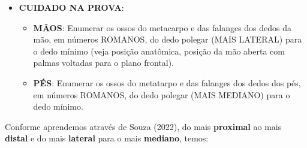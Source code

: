 \documentclass[
]{book}
\providecommand{\tightlist}{%
  \setlength{\itemsep}{0pt}\setlength{\parskip}{0pt}}
\begin{document}
\begin{itemize}
\tightlist
\item
  \textbf{CUIDADO NA PROVA}:

  \begin{itemize}
  \tightlist
  \item
    \textbf{MÃOS}: Enumerar os ossos do metacarpo e das falanges dos dedos da mão, em números ROMANOS, do dedo polegar (MAIS LATERAL) para o dedo mínimo (veja posição anatômica, posição da mão aberta com palmas voltadas para o plano frontal).
  \item
    \textbf{PÉS}: Enumerar os ossos do metatarpo e das falanges dos dedos dos pés, em números ROMANOS, do dedo polegar (MAIS MEDIANO) para o dedo mínimo.
  \end{itemize}
\end{itemize}

Conforme aprendemos através de Souza (2022), do mais \textbf{proximal} ao mais \textbf{distal} e do mais \textbf{lateral} para o mais \textbf{mediano}, temos:
\end{document}
